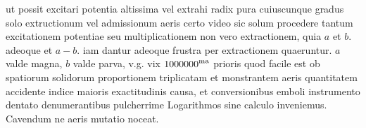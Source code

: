 ut possit excitari potentia altissima vel extrahi radix pura cuiuscunque gradus solo extructionum vel admissionum aeris certo
video sic solum procedere tantum excitationem potentiae seu multiplicationem non vero extractionem, quia $\displaystyle a$ et $\displaystyle b$. adeoque et $\displaystyle a-b$. iam dantur adeoque frustra per extractionem quaeruntur.
$\displaystyle a$ valde magna, $\displaystyle b$ valde parva,
v.g. vix $\displaystyle 1000000\textsuperscript{ma}$ prioris quod facile est ob spatiorum solidorum proportionem triplicatam et
\protect{}
monstrantem aeris quantitatem accidente indice maioris exactitudinis causa,
et conversionibus emboli instrumento\protect{} dentato denumerantibus pulcherrime Logarithmos sine calculo inveniemus.
Cavendum ne aeris mutatio noceat.
\pend%
\count{}
\count{}
\count{}
